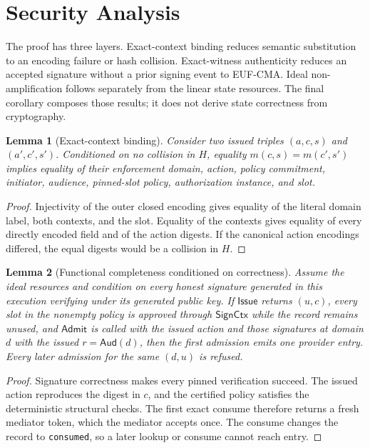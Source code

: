 \documentclass[10pt]{article}
\newtheorem{lemma}{Lemma}
\newcommand{\code}[1]{\texttt{#1}}
\newcommand{\Issue}{\mathsf{Issue}}
\newcommand{\Admit}{\mathsf{Admit}}
\begin{document}
\section{Security Analysis}
\label{sec:proof}

The proof has three layers. Exact-context binding reduces semantic substitution
to an encoding failure or hash collision. Exact-witness authenticity reduces an
accepted signature without a prior signing event to EUF-CMA. Ideal
non-amplification follows separately from the linear state resources. The final
corollary composes those results; it does not derive state correctness from
cryptography.

\begin{lemma}[Exact-context binding]
Consider two issued triples $(a,c,s)$ and $(a',c',s')$. Conditioned on no
collision in $H$, equality $m(c,s)=m(c',s')$ implies equality of their
enforcement domain, action, policy commitment, initiator, audience,
pinned-slot policy, authorization instance, and slot.
\end{lemma}

\begin{proof}
Injectivity of the outer closed encoding gives equality of the literal domain
label, both contexts, and the slot. Equality of the contexts gives equality of
every directly encoded field and of the action digests. If the canonical action
encodings differed, the equal digests would be a collision in $H$.
\end{proof}

\begin{lemma}[Functional completeness conditioned on correctness]
Assume the ideal resources and condition on every honest signature generated in
this execution verifying under its generated public key. If $\Issue$ returns
$(u,c)$, every slot in the nonempty policy is approved through $\mathsf{SignCtx}$
while the record remains unused, and $\Admit$ is called with the issued action
and those signatures at domain $d$ with the issued $r=\mathsf{Aud}(d)$, then
the first admission emits one provider entry.
Every later admission for the same $(d,u)$ is refused.
\end{lemma}

\begin{proof}
Signature correctness makes every pinned verification succeed. The issued
action reproduces the digest in $c$, and the certified policy satisfies the
deterministic structural checks. The first exact consume therefore returns a
fresh mediator token, which the mediator accepts once. The consume changes the
record to \code{consumed}, so a later lookup or consume cannot reach entry.
\end{proof}
\end{document}
